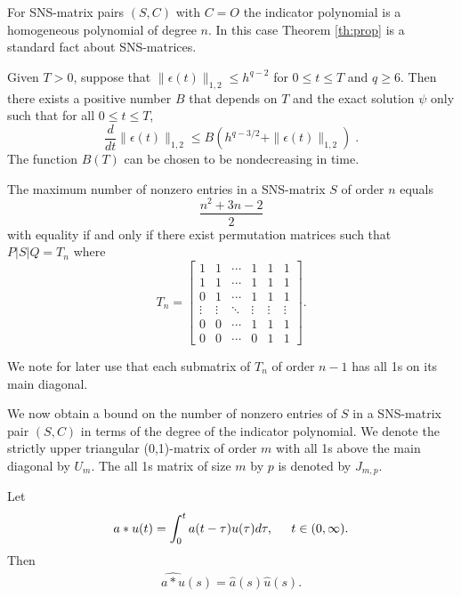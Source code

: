 \documentclass{SIAMGHbook2016}
\newcommand{\pe}{\psi}
\begin{document}
For SNS-matrix pairs $(S,C)$ with $C=O$ the indicator
polynomial is a homogeneous polynomial of degree $n$. In
this case Theorem \ref{th:prop} is a standard fact about
SNS-matrices.

\begin{lemma}[Stability]
\label{stability}
Given $T>0$, suppose that $\| \epsilon (t) \|_{1,2} \leq h^{q-2}$
for $0 \leq t \leq T$ and $q \geq 6$.
Then there exists a positive number $B$ that depends on
$T$ and the exact solution $\pe$ only such that for all $0 \leq t \leq T$,
\begin{equation}
\label{Gron}
\frac {d}{dt} \| \epsilon (t) \| _{1,2}  \leq B
   ( h^{q-3/2} + \| \epsilon (t) \|_{1,2})\;.
\end{equation}
The function $B(T)$ can be chosen to be nondecreasing in time.
\end{lemma}

\begin{theorem}
\label{th:gibson}
The maximum number of nonzero entries in a {\rm SNS}-matrix
$S$ of order $n$ equals \[\frac{n^{2}+3n-2}{2}\] with
equality if and only if there exist permutation matrices
such that $P|S|Q=T_{n}$ where
\begin{equation}
\label{eq:gibson}
T_{n}=\left[\begin{array}{cccccc} 1&1&\cdots&1&1&1\\
1&1&\cdots&1&1&1\\ 0&1&\cdots&1&1&1\\
\vdots&\vdots&\ddots&\vdots&\vdots&\vdots\\
0&0&\cdots&1&1&1\\ 0&0&\cdots&0&1&1\end{array}\right].
\end{equation}
\end{theorem}

We note for later use that each submatrix of $T_{n}$ of
order $n-1$ has all 1s on its main diagonal.

We now obtain a bound on the number of nonzero entries of
$S$ in a SNS-matrix pair $(S,C)$ in terms of the degree of
the indicator polynomial. We denote the strictly upper
triangular (0,1)-matrix of order $m$ with all 1s above the
main diagonal by $U_{m}$. The all 1s matrix of size $m$ by
$p$ is denoted by $J_{m,p}$.

\begin{proposition}
\label{pro:2.1}  Let
\begin{eqnarray*}
a\ast u(t) = \int_0^t a(t- \tau) u(\tau) d\tau, \hspace{.2in} t \in
(0, \infty).
\end{eqnarray*}
Then
\begin{eqnarray*}
\widehat{a\ast u}(s) = \widehat{a}(s)\widehat{u}(s).
\end{eqnarray*}
\end{proposition}
\end{document}

